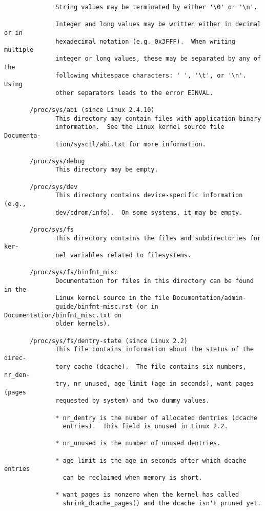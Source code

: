 \documentclass[]{article}
\begin{document}
\begin{verbatim}
              String values may be terminated by either '\0' or '\n'.

              Integer and long values may be written either in decimal or in
              hexadecimal notation (e.g. 0x3FFF).  When writing multiple
              integer or long values, these may be separated by any of the
              following whitespace characters: ' ', '\t', or '\n'.  Using
              other separators leads to the error EINVAL.

       /proc/sys/abi (since Linux 2.4.10)
              This directory may contain files with application binary
              information.  See the Linux kernel source file Documenta‐
              tion/sysctl/abi.txt for more information.

       /proc/sys/debug
              This directory may be empty.

       /proc/sys/dev
              This directory contains device-specific information (e.g.,
              dev/cdrom/info).  On some systems, it may be empty.

       /proc/sys/fs
              This directory contains the files and subdirectories for ker‐
              nel variables related to filesystems.

       /proc/sys/fs/binfmt_misc
              Documentation for files in this directory can be found in the
              Linux kernel source in the file Documentation/admin-
              guide/binfmt-misc.rst (or in Documentation/binfmt_misc.txt on
              older kernels).

       /proc/sys/fs/dentry-state (since Linux 2.2)
              This file contains information about the status of the direc‐
              tory cache (dcache).  The file contains six numbers, nr_den‐
              try, nr_unused, age_limit (age in seconds), want_pages (pages
              requested by system) and two dummy values.

              * nr_dentry is the number of allocated dentries (dcache
                entries).  This field is unused in Linux 2.2.

              * nr_unused is the number of unused dentries.

              * age_limit is the age in seconds after which dcache entries
                can be reclaimed when memory is short.

              * want_pages is nonzero when the kernel has called
                shrink_dcache_pages() and the dcache isn't pruned yet.


\end{verbatim}
\end{document}
